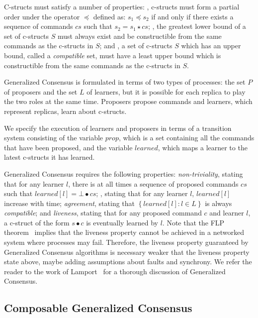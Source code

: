 C-structs must satisfy a number of properties: , c-structs must form a partial order under the operator $\preceq$ defined as: $s_1 \preceq s_2$ if and only if there exists a sequence of commands $cs$ such that $s_2 = s_1 \star cs$; , the greatest lower bound of a set of c-structs $S$ must always exist and be constructible from the same commands as the c-structs in $S$; and , a set of c-structs $S$
which has an upper bound, called a \emph{compatible} set, must have a least upper bound which is constructible from the same commands as the c-structs in $S$. 

Generalized Consensus is formulated in terms of two types of processes: the set $P$ of proposers and the set $L$ of learners, but it is possible for each replica to play the two roles at the same time. Proposers propose commands and learners, which represent replicas, learn about c-structs.

We specify the execution of learners and proposers in terms of a transition system consisting of the variable $prop$, which is a set containing all the commands that have been proposed, and the variable $learned$, which maps a learner to the latest c-structs it has learned.

Generalized Consensus requires the following properties: \emph{non-triviality}, stating that for any learner $l$, there is at all times a sequence of proposed commands $cs$ such that $learned\left[l\right] = \bot \bullet cs$; , stating that for any learner $l$, $learned\left[ l \right]$ increase with time; \emph{agreement}, stating that $\left\{ learned\left[ l \right] :  l \in L\right\}$ is always \emph{compatible}; and \emph{liveness}, stating that for any proposed command $c$ and learner $l$, a c-struct of the form $s\bullet c$ is eventually learned by $l$.
Note that the FLP theorem~\cite{FischerLynchPaterson83ImpossibilityDistributedConsensusOneFaultyProcess} implies that the liveness property cannot be achieved in a networked system where processes may fail. Therefore, the liveness property guaranteed by Generalized Consensus algorithms is necessary weaker that the liveness property state above, maybe adding assumptions about faults and synchrony.
We refer the reader to the work of Lamport~\cite{Lamport05GeneralizeConsensus} for a thorough discussion of Generalized Consensus.

\subsection{Composable Generalized Consensus}

